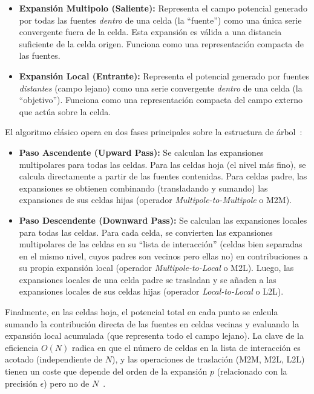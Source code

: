 \begin{itemize}
    \item \textbf{Expansión Multipolo (Saliente):} Representa el campo potencial generado por todas las fuentes \textit{dentro} de una celda (la ``fuente'') como una única serie convergente fuera de la celda. Esta expansión es válida a una distancia suficiente de la celda origen. Funciona como una representación compacta de las fuentes.
    \item \textbf{Expansión Local (Entrante):} Representa el potencial generado por fuentes \textit{distantes} (campo lejano) como una serie convergente \textit{dentro} de una celda (la ``objetivo''). Funciona como una representación compacta del campo externo que actúa sobre la celda.
\end{itemize}

El algoritmo clásico opera en dos fases principales sobre la estructura de árbol~\cite{BeatsonGreengard1997, GreengardRokhlin1987, Martinsson2012}:

\begin{itemize}
    \item \textbf{Paso Ascendente (Upward Pass):} Se calculan las expansiones multipolares para todas las celdas. Para las celdas hoja (el nivel más fino), se calcula directamente a partir de las fuentes contenidas. Para celdas padre, las expansiones se obtienen combinando (transladando y sumando) las expansiones de sus celdas hijas (operador \textit{Multipole-to-Multipole} o M2M).
    \item \textbf{Paso Descendente (Downward Pass):} Se calculan las expansiones locales para todas las celdas. Para cada celda, se convierten las expansiones multipolares de las celdas en su ``lista de interacción'' (celdas bien separadas en el mismo nivel, cuyos padres son vecinos pero ellas no) en contribuciones a su propia expansión local (operador \textit{Multipole-to-Local} o M2L). Luego, las expansiones locales de una celda padre se trasladan y se añaden a las expansiones locales de sus celdas hijas (operador \textit{Local-to-Local} o L2L).
\end{itemize}

Finalmente, en las celdas hoja, el potencial total en cada punto se calcula sumando la contribución directa de las fuentes en celdas vecinas y evaluando la expansión local acumulada (que representa todo el campo lejano). La clave de la eficiencia $O(N)$ radica en que el número de celdas en la lista de interacción es acotado (independiente de $N$), y las operaciones de traslación (M2M, M2L, L2L) tienen un coste que depende del orden de la expansión $p$ (relacionado con la precisión $\epsilon$) pero no de $N$~\cite{GreengardRokhlin1987}.

